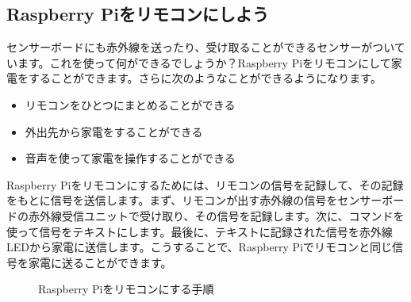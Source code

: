 \subsection{Raspberry Piをリモコンにしよう}

センサーボードにも赤外線を送ったり、受け取ることができるセンサーがついています。これを使って何ができるでしょうか？Raspberry Piをリモコンにして家電をすることができます。さらに次のようなことができるようになります。

\begin{itemize}
\item リモコンをひとつにまとめることができる
\item 外出先から家電をすることができる
\item 音声を使って家電を操作することができる
\end{itemize}

Raspberry Piをリモコンにするためには、リモコンの信号を記録して、その記録をもとに信号を送信します。まず、リモコンが出す赤外線の信号をセンサーボードの赤外線受信ユニットで受け取り、その信号を記録します。次に、コマンドを使って信号をテキストにします。最後に、テキストに記録された信号を赤外線LEDから家電に送信します。こうすることで、Raspberry Piでリモコンと同じ信号を家電に送ることができます。

\begin{figure}[H]
    \centering
 
    \caption{Raspberry Piをリモコンにする手順}
\end{figure}

